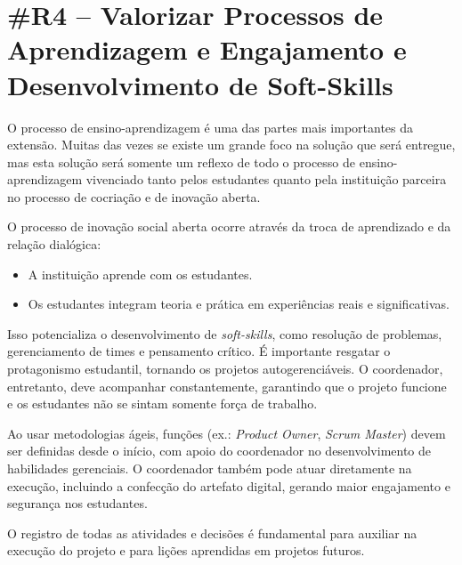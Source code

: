 \section*{\#R4 – Valorizar Processos de Aprendizagem e Engajamento e Desenvolvimento de Soft-Skills}

O processo de ensino-aprendizagem é uma das partes mais importantes da extensão. Muitas das vezes se existe um grande foco na solução que será entregue, mas esta solução será somente um reflexo de todo o processo de ensino-aprendizagem vivenciado tanto pelos estudantes quanto pela instituição parceira no processo de cocriação e de inovação aberta.

O processo de inovação social aberta ocorre através da troca de aprendizado e da relação dialógica:
\begin{itemize}
    \item A instituição aprende com os estudantes.
    \item Os estudantes integram teoria e prática em experiências reais e significativas.
\end{itemize}

Isso potencializa o desenvolvimento de \textit{soft-skills}, como resolução de problemas, gerenciamento de times e pensamento crítico. É importante resgatar o protagonismo estudantil, tornando os projetos autogerenciáveis. O coordenador, entretanto, deve acompanhar constantemente, garantindo que o projeto funcione e os estudantes não se sintam somente força de trabalho.

Ao usar metodologias ágeis, funções (ex.: \textit{Product Owner}, \textit{Scrum Master}) devem ser definidas desde o início, com apoio do coordenador no desenvolvimento de habilidades gerenciais. O coordenador também pode atuar diretamente na execução, incluindo a confecção do artefato digital, gerando maior engajamento e segurança nos estudantes.

O registro de todas as atividades e decisões é fundamental para auxiliar na execução do projeto e para lições aprendidas em projetos futuros.
